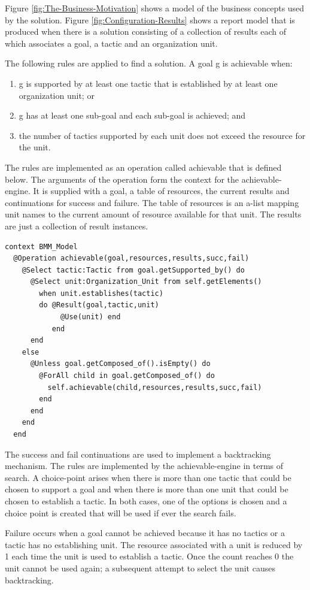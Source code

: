 Figure \ref{fig:The-Business-Motivation} shows a model of the business
concepts used by the solution. Figure \ref{fig:Configuration-Results}
shows a report model that is produced when there is a solution consisting
of a collection of results each of which associates a goal, a tactic
and an organization unit.

The following rules are applied to find a solution. A goal g is achievable
when:

\begin{enumerate}
\item g is supported by at least one tactic that is established by at least
one organization unit; or
\item g has at least one sub-goal and each sub-goal is achieved; and
\item the number of tactics supported by each unit does not exceed the resource
for the unit.
\end{enumerate}
The rules are implemented as an operation called achievable that is
defined below. The arguments of the operation form the context for
the achievable-engine. It is supplied with a goal, a table of resources,
the current results and continuations for success and failure. The
table of resources is an a-list mapping unit names to the current
amount of resource available for that unit. The results are just a
collection of result instances. 

\begin{lstlisting}
context BMM_Model
  @Operation achievable(goal,resources,results,succ,fail)
    @Select tactic:Tactic from goal.getSupported_by() do
      @Select unit:Organization_Unit from self.getElements() 
        when unit.establishes(tactic)
        do @Result(goal,tactic,unit) 
             @Use(unit) end
           end
      end
    else
      @Unless goal.getComposed_of().isEmpty() do 
        @ForAll child in goal.getComposed_of() do
          self.achievable(child,resources,results,succ,fail)
        end
      end
    end
  end
\end{lstlisting}The success and fail continuations are used to implement a backtracking
mechanism. The rules are implemented by the achievable-engine in terms
of search. A choice-point arises when there is more than one tactic
that could be chosen to support a goal and when there is more than
one unit that could be chosen to establish a tactic. In both cases,
one of the options is chosen and a choice point is created that will
be used if ever the search fails. 

Failure occurs when a goal cannot be achieved because it has no tactics
or a tactic has no establishing unit. The resource associated with
a unit is reduced by 1 each time the unit is used to establish a tactic.
Once the count reaches 0 the unit cannot be used again; a subsequent
attempt to select the unit causes backtracking.


